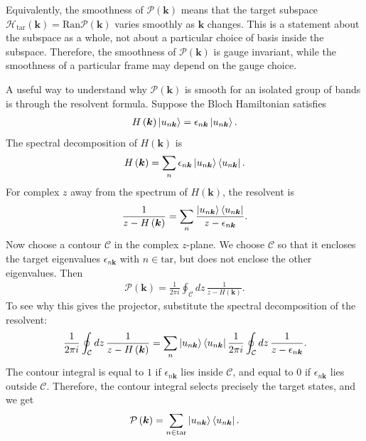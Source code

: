 \documentclass[12pt, oneside]{article}
\newcommand{\mr}[1]{\mathrm{#1}}
\newcommand{\p}[1]{\left(#1\right)}
\numberwithin{equation}{subsection}
\begin{document}
Equivalently, the smoothness of \(\mathcal{P}\p{\bm{k}}\) means that the target subspace \(\mathcal{H}_{\mr{tar}}\p{\bm{k}}=\mr{Ran}\mathcal{P}\p{\bm{k}}\) varies smoothly as \(\bm{k}\) changes. This is a statement about the subspace as a whole, not about a particular choice of basis inside the subspace. Therefore, the smoothness of \(\mathcal{P}\p{\bm{k}}\) is gauge invariant, while the smoothness of a particular frame may depend on the gauge choice.

A useful way to understand why \(\mathcal{P}\p{\bm{k}}\) is smooth for an isolated group of bands is through the resolvent formula. Suppose the Bloch Hamiltonian satisfies
\begin{align}
	H\p{\bm{k}}\ket{u_{n\bm{k}}}=\epsilon_{n\bm{k}}\ket{u_{n\bm{k}}}.
\end{align}
The spectral decomposition of \(H\p{\bm{k}}\) is
\begin{align}
	H\p{\bm{k}}=\sum_n\epsilon_{n\bm{k}}\ket{u_{n\bm{k}}}\bra{u_{n\bm{k}}}.
\end{align}
For complex \(z\) away from the spectrum of \(H\p{\bm{k}}\), the resolvent is
\begin{align}
	\frac{1}{z-H\p{\bm{k}}}=\sum_n\frac{\ket{u_{n\bm{k}}}\bra{u_{n\bm{k}}}}{z-\epsilon_{n\bm{k}}}.
\end{align}
Now choose a contour \(\mathcal{C}\) in the complex \(z\)-plane. We choose \(\mathcal{C}\) so that it encloses the target eigenvalues \(\epsilon_{n\bm{k}}\) with \(n\in\mr{tar}\), but does not enclose the other eigenvalues. Then
\begin{align}
	\boxed{
		\mathcal{P}\p{\bm{k}}=\frac{1}{2\pi i}\oint_{\mathcal{C}}dz\,\frac{1}{z-H\p{\bm{k}}}
	}.
\end{align}
To see why this gives the projector, substitute the spectral decomposition of the resolvent:
\begin{align}
	\frac{1}{2\pi i}\oint_{\mathcal{C}}dz\,\frac{1}{z-H\p{\bm{k}}}=\sum_n\ket{u_{n\bm{k}}}\bra{u_{n\bm{k}}}\frac{1}{2\pi i}\oint_{\mathcal{C}}dz\,\frac{1}{z-\epsilon_{n\bm{k}}}.
\end{align}
The contour integral is equal to \(1\) if \(\epsilon_{n\bm{k}}\) lies inside \(\mathcal{C}\), and equal to \(0\) if \(\epsilon_{n\bm{k}}\) lies outside \(\mathcal{C}\). Therefore, the contour integral selects precisely the target states, and we get
\begin{align}
	\mathcal{P}\p{\bm{k}}=\sum_{n\in\mr{tar}}\ket{u_{n\bm{k}}}\bra{u_{n\bm{k}}}.
\end{align}
\end{document}
